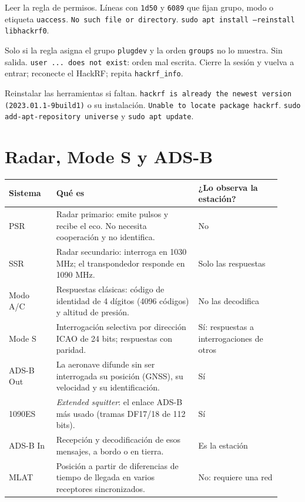 {Leer la regla de permisos.}
{Líneas con \texttt{1d50} y \texttt{6089} que fijan grupo, modo o etiqueta \texttt{uaccess}.}
{\texttt{No such file or directory}.}
{\texttt{sudo apt install --reinstall libhackrf0}.}

{Solo si la regla asigna el grupo \texttt{plugdev} y la orden \texttt{groups} no lo muestra.}
{Sin salida.}
{\texttt{user ... does not exist}: orden mal escrita.}
{Cierre la sesión y vuelva a entrar; reconecte el HackRF; repita \texttt{hackrf\_info}.}

{Reinstalar las herramientas si faltan.}
{\texttt{hackrf is already the newest version (2023.01.1-9build1)} o su instalación.}
{\texttt{Unable to locate package hackrf}.}
{\texttt{sudo add-apt-repository universe} y \texttt{sudo apt update}.}

\section{Radar, Mode S y ADS-B}
\label{sec:a-sistemas}

\begin{longtable}{@{}>{\raggedright\arraybackslash}p{0.16\linewidth}>{\raggedright\arraybackslash}p{0.48\linewidth}>{\raggedright\arraybackslash}p{0.28\linewidth}@{}}
\toprule
\textbf{Sistema} & \textbf{Qué es} & \textbf{¿Lo observa la estación?} \\
\midrule
\endhead
PSR & Radar primario: emite pulsos y recibe el eco. No necesita cooperación y no identifica. & No \\
SSR & Radar secundario: interroga en 1030 MHz; el transpondedor responde en 1090 MHz. & Solo las respuestas \\
Modo A/C & Respuestas clásicas: código de identidad de 4 dígitos (4096 códigos) y altitud de presión. & No las decodifica \\
Mode S & Interrogación selectiva por dirección ICAO de 24 bits; respuestas con paridad. & Sí: respuestas a interrogaciones de otros \\
ADS-B Out & La aeronave difunde sin ser interrogada su posición (GNSS), su velocidad y su identificación. & Sí \\
1090ES & \emph{Extended squitter}: el enlace ADS-B más usado (tramas DF17/18 de 112 bits). & Sí \\
ADS-B In & Recepción y decodificación de esos mensajes, a bordo o en tierra. & Es la estación \\
MLAT & Posición a partir de diferencias de tiempo de llegada en varios receptores sincronizados. & No: requiere una red \\
\bottomrule
\end{longtable}

